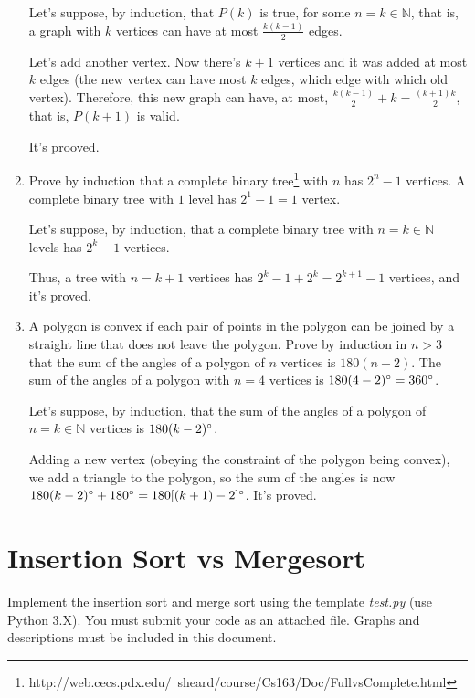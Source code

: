 \documentclass{article}
\begin{document}
\begin{enumerate}
  Let's suppose, by induction, that $P(k)$ is true, for some $n = k \in \mathbb{N}$, that is, a graph with $k$ vertices can have at most $\frac{k(k - 1)}{2}$ edges.
  
  Let's add another vertex. Now there's $k + 1$ vertices and it was added at most $k$ edges (the new vertex can have most $k$ edges, which edge with which old vertex). Therefore, this new graph can have, at most, $\frac{k(k - 1)}{2} + k = \frac{(k + 1)k}{2}$, that is, $P(k + 1)$ is valid.
  
  It's prooved.
  \bigbreak
  \item Prove by induction that a complete binary tree\footnote{http://web.cecs.pdx.edu/~sheard/course/Cs163/Doc/FullvsComplete.html} with $n$ has $2^n-1$ vertices.
  \bigbreak
  A complete binary tree with $1$ level has $2^1 - 1 = 1$ vertex.
  
  Let's suppose, by induction, that a complete binary tree with $n = k \in \mathbb{N}$ levels has $2^k - 1$ vertices.
  
  Thus, a tree with $n = k + 1$ vertices has $2^k - 1 + 2^k = 2^{k + 1} - 1$ vertices, and it's proved.
  \bigbreak
  \item A polygon is convex if each pair of points in the polygon can be joined by a straight line that does not leave the polygon. Prove by induction in $n>3$ that the sum of the angles of a polygon of $n$ vertices is $180(n-2)$.
  \bigbreak
  The sum of the angles of a polygon with $n = 4$ vertices is $180(4 - 2)\degree = 360\degree$.
  
  Let's suppose, by induction, that the sum of the angles of a polygon of $n = k \in \mathbb{N}$ vertices is $180(k - 2)\degree$.
  
  Adding a new vertex (obeying the constraint of the polygon being convex), we add a triangle to the polygon, so the sum of the angles is now $180(k - 2)\degree + 180\degree = 180[(k + 1) - 2]\degree$. It's proved.
  \bigbreak
\end{enumerate}


\section{Insertion Sort vs Mergesort}
Implement the insertion sort and merge sort using the template \emph{test.py} (use Python 3.X). You must submit your code as an attached file. Graphs and descriptions must be included in this document. 
\end{document}
